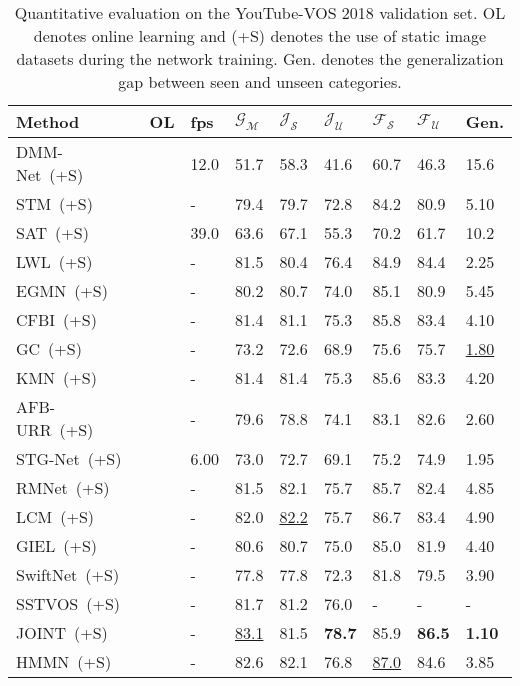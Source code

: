 \documentclass[runningheads]{llncs}
\begin{document}
\begin{table}[h!]
	\centering 
	\caption{Quantitative evaluation on the YouTube-VOS 2018 validation set. OL denotes online learning and (+S) denotes the use of static image datasets during the network training. Gen. denotes the generalization gap between seen and unseen categories.}
	\begin{tabular}{lP{0.8cm}P{1cm}P{1cm}P{1cm}P{1cm}P{1cm}P{1cm}P{1cm}}
		\toprule
		Method &OL &fps &$\mathcal{G}_\mathcal{M}$ &$\mathcal{J}_\mathcal{S}$ &$\mathcal{J}_\mathcal{U}$ &$\mathcal{F}_\mathcal{S}$ &$\mathcal{F}_\mathcal{U}$ &Gen.\\
		\midrule
        DMM-Net~(+S)~\cite{DMM-Net} & &12.0 &51.7 &58.3 &41.6 &60.7 &46.3 &15.6\\
		STM~(+S)~\cite{STM} & &- &79.4 &79.7 &72.8 &84.2 &80.9 &5.10\\
		SAT~(+S)~\cite{SAT} & &39.0 &63.6 &67.1 &55.3 &70.2 &61.7 &10.2\\
		LWL~(+S)~\cite{LWL} &\checkmark &- &81.5 &80.4 &76.4 &84.9 &84.4 &2.25\\
        EGMN~(+S)~\cite{EGMN} & &- &80.2 &80.7 &74.0 &85.1 &80.9 &5.45\\
		CFBI~(+S)~\cite{CFBI} & &- &81.4 &81.1 &75.3 &85.8 &83.4 &4.10\\
		GC~(+S)~\cite{GC} & &- &73.2 &72.6 &68.9 &75.6 &75.7 &\underline{1.80}\\
		KMN~(+S)~\cite{KMN} & &- &81.4 &81.4 &75.3 &85.6 &83.3 &4.20\\
        AFB-URR~(+S)~\cite{AFB-URR} & &- &79.6 &78.8 &74.1 &83.1 &82.6 &2.60\\
		STG-Net~(+S)~\cite{STG-Net} & &6.00 &73.0 &72.7 &69.1 &75.2 &74.9 &1.95\\
		RMNet~(+S)~\cite{RMNet} & &- &81.5 &82.1 &75.7 &85.7 &82.4 &4.85\\
		LCM~(+S)~\cite{LCM} & &- &82.0 &\underline{82.2} &75.7 &86.7 &83.4 &4.90\\
		GIEL~(+S)~\cite{GIEL} & &- &80.6 &80.7 &75.0 &85.0 &81.9 &4.40\\
		SwiftNet~(+S)~\cite{SwiftNet} & &- &77.8 &77.8 &72.3 &81.8 &79.5 &3.90\\
		SSTVOS~(+S)~\cite{SSTVOS} & &- &81.7 &81.2 &76.0 &- &- &-\\
		JOINT~(+S)~\cite{JOINT} &\checkmark &- &\underline{83.1} &81.5 &\textbf{78.7} &85.9 &\textbf{86.5} &\textbf{1.10}\\
		HMMN~(+S)~\cite{HMMN} & &- &82.6 &82.1 &76.8 &\underline{87.0} &84.6 &3.85\\

\end{tabular}
\end{table}
\end{document}
